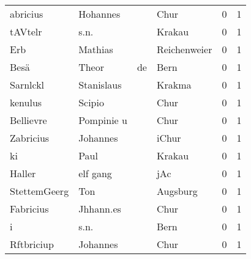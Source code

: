 \begin{center}
\begin{tiny}
\begin{longtabu}{llllrr}
                 abricius &                           Hohannes &             &                                        Chur &          0 &         1 \\
                  tAVtelr &                               s.n. &             &                                      Krakau &          0 &         1 \\
                      Erb &                            Mathias &             &                                Reichenweier &          0 &         1 \\
                     Besä &                              Theor &          de &                                        Bern &          0 &         1 \\
                 Sarnlckl &                         Stanislaus &             &                                      Krakma &          0 &         1 \\
                  kenulus &                             Scipio &             &                                        Chur &          0 &         1 \\
                Bellievre &                         Pompinie u &             &                                        Chur &          0 &         1 \\
                Zabricius &                           Johannes &             &                                       iChur &          0 &         1 \\
                       ki &                               Paul &             &                                      Krakau &          0 &         1 \\
                   Haller &                           elf gang &             &                                         jAc &          0 &         1 \\
             StettemGeerg &                                Ton &             &                                    Augsburg &          0 &         1 \\
                Fabricius &                          Jhhann.es &             &                                        Chur &          0 &         1 \\
                        i &                               s.n. &             &                                        Bern &          0 &         1 \\
               Rftbriciup &                           Johannes &             &                                        Chur &          0 &         1 \\

\end{longtabu}
\end{tiny}
\end{center}
